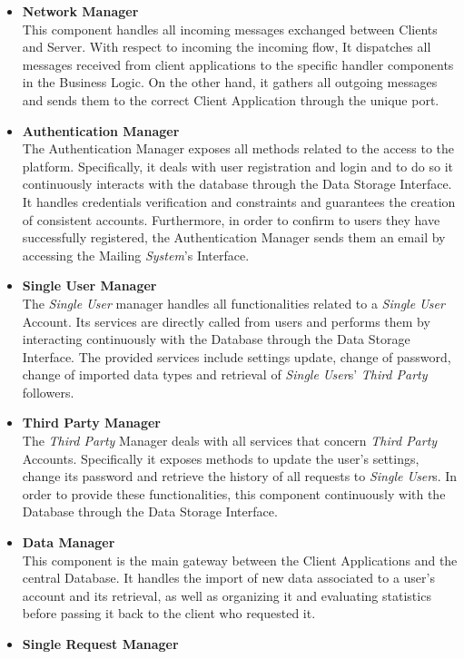 \documentclass[titlepage]{article}
\begin{document}
\begin{itemize}
        \item {\bf Network Manager }\\
        This component handles all incoming messages exchanged between Clients and Server. With respect to incoming the incoming flow, It dispatches all messages received from client applications to the specific handler components in the Business Logic. On the other hand, it gathers all outgoing messages and sends them to the correct Client Application through the unique port.
		\item {\bf Authentication Manager }\\
		The Authentication Manager exposes all methods related to the access to the platform. Specifically, it deals with user registration and login and to do so it continuously interacts with the database through the Data Storage Interface. It handles credentials verification and constraints and guarantees the creation of consistent accounts. Furthermore, in order to confirm to users they have successfully registered, the Authentication Manager sends them an email by accessing the Mailing {\it System}’s Interface.
		\item {\bf Single User Manager }\\
		The {\it Single User} manager handles all functionalities related to a {\it Single User} Account. Its services are directly called from users and performs them by interacting continuously with the Database through the Data Storage Interface. The provided services include settings update, change of password, change of imported data types and retrieval of {\it Single User}s’ {\it Third Party} followers.
		\item {\bf Third Party Manager }\\
		The {\it Third Party} Manager deals with all services that concern {\it Third Party} Accounts. Specifically it exposes methods to update the user’s settings, change its password and retrieve the history of all requests to {\it Single User}s. In order to provide these functionalities, this component continuously with the Database through the Data Storage Interface.
		\item {\bf Data Manager }\\
		This component is the main gateway between the Client Applications and the central Database. It handles the import of new data associated to a user’s account and its retrieval, as well as organizing it and evaluating statistics before passing it back to the client who requested it.
		\item {\bf Single Request Manager }\\

\end{itemize}
\end{document}
